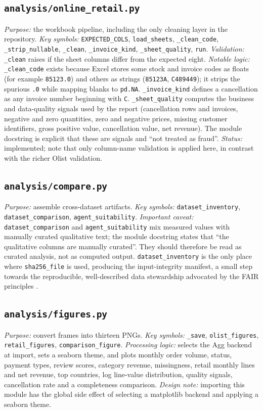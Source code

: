 \documentclass[11pt,a4paper]{article}
\newcommand{\code}[1]{\texttt{#1}}
\begin{document}
\subsection{\code{analysis/online\_retail.py}}
\textit{Purpose:} the workbook pipeline, including the only cleaning layer in the repository. \textit{Key symbols:} \code{EXPECTED\_COLS}, \code{load\_sheets}, \code{\_clean\_code}, \code{\_strip\_nullable}, \code{\_clean}, \code{\_invoice\_kind}, \code{\_sheet\_quality}, \code{run}. \textit{Validation:} \code{\_clean} raises if the sheet columns differ from the expected eight. \textit{Notable logic:} \code{\_clean\_code} exists because Excel stores some stock and invoice codes as floats (for example \code{85123.0}) and others as strings (\code{85123A}, \code{C489449}); it strips the spurious \code{.0} while mapping blanks to \code{pd.NA}. \code{\_invoice\_kind} defines a cancellation as any invoice number beginning with \code{C}. \code{\_sheet\_quality} computes the business and data-quality signals used by the report (cancellation rows and invoices, negative and zero quantities, zero and negative prices, missing customer identifiers, gross positive value, cancellation value, net revenue). The module docstring is explicit that these are signals and ``not treated as fraud''. \textit{Status:} implemented; note that only column-name validation is applied here, in contrast with the richer Olist validation.

\subsection{\code{analysis/compare.py}}
\textit{Purpose:} assemble cross-dataset artifacts. \textit{Key symbols:} \code{dataset\_inventory}, \code{dataset\_comparison}, \code{agent\_suitability}. \textit{Important caveat:} \code{dataset\_comparison} and \code{agent\_suitability} mix measured values with manually curated qualitative text; the module docstring states that ``the qualitative columns are manually curated''. They should therefore be read as curated analysis, not as computed output. \code{dataset\_inventory} is the only place where \code{sha256\_file} is used, producing the input-integrity manifest, a small step towards the reproducible, well-described data stewardship advocated by the FAIR principles \cite{wilkinson2016}.

\subsection{\code{analysis/figures.py}}
\textit{Purpose:} convert frames into thirteen PNGs. \textit{Key symbols:} \code{\_save}, \code{olist\_figures}, \code{retail\_figures}, \code{comparison\_figure}. \textit{Processing logic:} selects the Agg backend at import, sets a seaborn theme, and plots monthly order volume, status, payment types, review scores, category revenue, missingness, retail monthly lines and net revenue, top countries, log line-value distribution, quality signals, cancellation rate and a completeness comparison. \textit{Design note:} importing this module has the global side effect of selecting a matplotlib backend and applying a seaborn theme.
\end{document}
